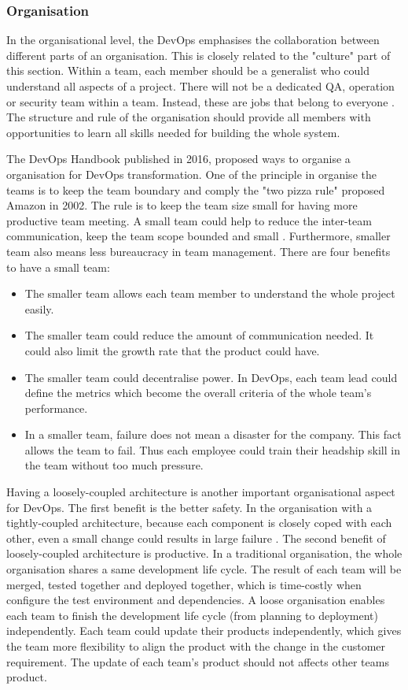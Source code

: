 \subsubsection[]{Organisation}
In the organisational level, the DevOps emphasises the collaboration between different parts of an organisation. This is closely related to the "culture" part of this section. 
Within a team, each member should be a generalist who could understand all aspects of a project. There will not be a dedicated QA, operation or security team within a team. Instead, these are jobs that belong to everyone \cite{feitelson2013development}\cite{kim2016devops}. The structure and rule of the organisation should provide all members with opportunities to learn all skills needed for building the whole system. 
\par
The DevOps Handbook \cite{kim2016devops} published in 2016, proposed ways to organise a organisation for DevOps transformation. One of the principle in organise the teams is to keep the team boundary and comply the "two pizza rule" proposed Amazon in 2002. The rule is to keep the team size small for having more productive team meeting.
A small team could help to reduce the inter-team communication, keep the team scope bounded and small \cite{kim2016devops}. Furthermore, smaller team also means less bureaucracy in team management. There are four benefits to have a small team:
\begin{itemize}
    \item The smaller team allows each team member to understand the whole project easily.
    \item The smaller team could reduce the amount of communication needed. It could also limit the growth rate that the product could have.
    \item The smaller team could decentralise power. In DevOps, each team lead could define the metrics which become the overall criteria of the whole team's performance.
    \item In a smaller team, failure does not mean a disaster for the company. This fact allows the team to fail. Thus each employee could train their headship skill in the team without too much pressure. 
\end{itemize} 
\par
Having a loosely-coupled architecture is another important organisational aspect for DevOps. The first benefit is the better safety. In the organisation with a tightly-coupled architecture, because each component is closely coped with each other, even a small change could results in large failure \cite{kim2016devops}. The second benefit of loosely-coupled architecture is productive. In a traditional organisation, the whole organisation shares a same development life cycle. The result of each team will be merged, tested together and deployed together, which is time-costly when configure the test environment and dependencies. A loose organisation enables each team to finish the development life cycle (from planning to deployment) independently. Each team could update their products independently, which gives the team more flexibility to align the product with the change in the customer requirement. 
The update of each team’s product should not affects other teams product. 
